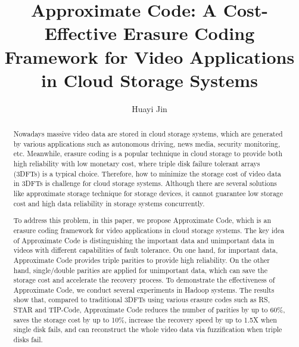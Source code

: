 \documentclass[sigconf]{acmart}
\begin{document}
\title{Approximate Code: A Cost-Effective Erasure Coding Framework for Video Applications in Cloud Storage Systems}

\author{Huayi Jin}



\begin{abstract}
Nowadays massive video data are stored in cloud storage systems, which are generated by various applications such as autonomous driving, news media, security monitoring, etc. Meanwhile, erasure coding is a popular technique in cloud storage to provide both high reliability with low monetary cost, where triple disk failure tolerant arrays (3DFTs) is a typical choice. Therefore, how to minimize the storage cost of video data in 3DFTs is challenge for cloud storage systems. Although there are several solutions like approximate storage technique for storage devices, it cannot guarantee low storage cost and high data reliability in storage systems concurrently.

To address this problem, in this paper, we propose Approximate Code, which is an erasure coding framework for video applications in cloud storage systems. The key idea of Approximate Code is distinguishing the important data and unimportant data in videos with different capabilities of fault tolerance. On one hand, for important data, Approximate Code provides triple parities to provide high reliability. On the other hand, single/double parities are applied for unimportant data, which can save the storage cost and accelerate the recovery process. To demonstrate the effectiveness of Approximate Code, we conduct several experiments in Hadoop systems. The results show that, compared to traditional 3DFTs using various erasure codes such as RS, STAR and TIP-Code, Approximate Code reduces the number of parities by up to 60\%, saves the storage cost by up to 10\%, increase the recovery speed by up to 1.5X when single disk fails, and can reconstruct the whole video data via fuzzification when triple disks fail.

\end{abstract}
\end{document}
